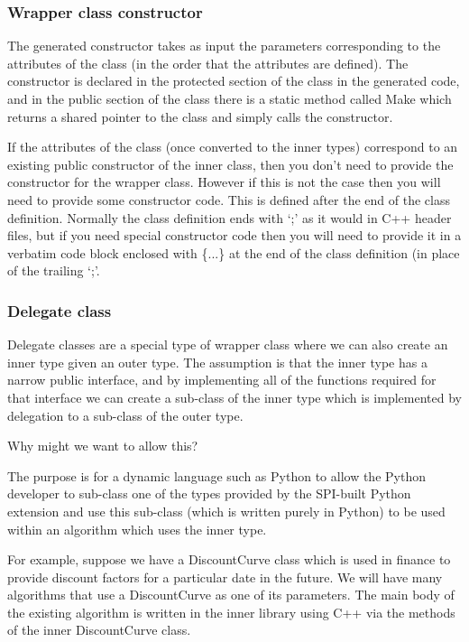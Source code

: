 \subsubsection*{Wrapper class constructor}

The generated constructor takes as input the parameters corresponding to the attributes of the class (in the order that the attributes are defined).
The constructor is declared in the protected section of the class in the generated code, and in the public section of the class there is a static method called Make which returns a shared pointer to the class and simply calls the constructor.

If the attributes of the class (once converted to the inner types) correspond to an existing public constructor of the inner class, then you don't need to provide the constructor for the wrapper class.
However if this is not the case then you will need to provide some constructor code.
This is defined after the end of the class definition.
Normally the class definition ends with `;' as it would in C++ header files, but if you need special constructor code then you will need to provide it in a verbatim code block enclosed with \{...\} at the end of the class definition (in place of the trailing `;'.

\newpage
\subsubsection{Delegate class} \label{delegateClass}

Delegate classes are a special type of wrapper class where we can also create an inner type given an outer type.
The assumption is that the inner type has a narrow public interface, and by implementing all of the functions required for that interface we can create a sub-class of the inner type which is implemented by delegation to a sub-class of the outer type.

Why might we want to allow this?

The purpose is for a dynamic language such as Python to allow the Python developer to sub-class one of the types provided by the SPI-built Python extension and use this sub-class (which is written purely in Python) to be used within an algorithm which uses the inner type.

For example, suppose we have a DiscountCurve class which is used in finance to provide discount factors for a particular date in the future.
We will have many algorithms that use a DiscountCurve as one of its parameters.
The main body of the existing algorithm is written in the inner library using C++ via the methods of the inner DiscountCurve class.

